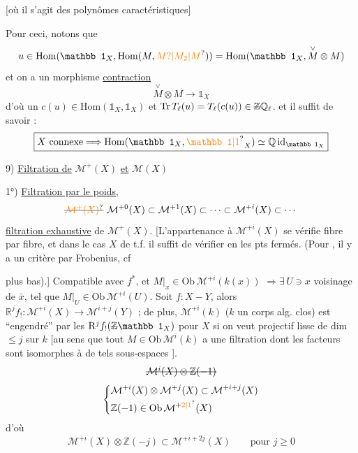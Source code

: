 [où il s'agit des polynômes caractéristiques] %

Pour ceci, notons que %
\[
u\in\mathrm{Hom}(\mathbb 1_X,\mathrm{Hom}(M,\unsure{M?|M_2|M}))=\mathrm{Hom}(\mathbb 1_X,\overset{\vee}{M}\otimes M) %
\]
et on a un morphisme \uline{contraction} %
\[
\overset{\vee}{M}\otimes M\longrightarrow\mathbb 1_X %
\]
d'où un $c(u)\in\mathrm{Hom}(\mathbb 1_X,\mathbb 1_X)$ %
et  $\mathrm{Tr}\,T_\ell(u)=T_\ell(c(u))\in\deleted{\mathbb Z}\mathbb Q_\ell$. %
et il suffit de savoir : %
\[
\boxed{X\ \text{connexe}\Longrightarrow\mathrm{Hom}(\mathbb 1_X,\unsure{\mathbb 1|1}_X)\simeq\mathbb Q\,\mathrm{id}_{\mathbb 1_X}} %
\]

9) \uline{Filtration de} $\mathcal M^+(X)$ \uline{et} $\mathcal M(X)$ %

1°) \uline{Filtration par le poids},  %
\[
\deleted{\unsure{\mathcal M^+(X)}}\ \mathcal M^{+0}(X)\subset\mathcal M^{+1}(X)\subset\cdots\subset\mathcal M^{+i}(X)\subset\cdots %
\]
\uline{filtration exhaustive} de $\mathcal M^+(X)$. [L'appartenance %
à $\mathcal M^{+i}(X)$ se vérifie fibre par fibre,  %
 et dans le cas $X$ de t.f.  il suffit de %
vérifier en les pts fermés. (Pour  %
, il y a un critère par Frobenius, cf %

plus bas).]  %
 Compatible avec %
$f^*$, et  $M|_x\in\mathrm{Ob}\,\mathcal M^{+i}(k(x))$ %
$\Longrightarrow\exists\,U\ni x$ voisinage de $\bar x$, tel que %
$M|_U\in\mathrm{Ob}\,\mathcal M^{+i}(U)$. Soit $f:X-Y$, %
alors $\mathbb R^j f_!:\mathcal M^{+i}(X)\longrightarrow\mathcal M^{i+j}(Y)$ ; de %
plus, $\mathcal M^{+i}(k)$ ($k$ un corps alg. clos) %
est ``engendré'' par les  $\mathrm R^j f_!(\deleted{\mathbb Z}\mathbb 1_X)$ pour %
$X$ si on veut projectif lisse de dim $\leq j$ sur $k$ %
[au sens que tout $M\in\mathrm{Ob}\,\mathcal M^i(k)$ a une %
filtration dont les facteurs sont isomorphes %
à de tels sous-espaces ]. %
\[
\deleted{\mathcal M^i(X)\otimes\mathbb Z(-1)} %
\]
\[
\left\{\begin{aligned}
&\mathcal M^{+i}(X)\otimes\mathcal M^{+j}(X)\subset\mathcal M^{+i+j}(X)\\ %
&\mathbb Z(-1)\in\mathrm{Ob}\,\mathcal M^{+\unsure{2|1}}(X) %
\end{aligned}\right.
\]
d'où %
\[
\mathcal M^{+i}(X)\otimes\mathbb Z(-j)\subset\mathcal M^{+i+2j}(X)\qquad\text{pour }j\geq0 %
\]

